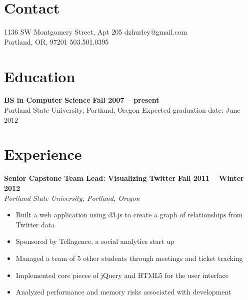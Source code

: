 \documentclass[margin,line]{resume}
\begin{document}
\begin{resume}

    \section{\mysidestyle Contact}

    1136 SW Montgomery Street, Apt 205  \hfill dzhurley@gmail.com  \vspace{0mm}\\\vspace{0mm}%
    Portland, OR, 97201                 \hfill 503.501.0395        \vspace{0mm}\\\vspace{0mm}%

    \section{\mysidestyle Education}

    \textbf{BS in Computer Science}             \hfill \textbf{ Fall 2007 -- present}      \vspace{2mm}\\\vspace{1mm}%
    Portland State University, Portland, Oregon \hfill Expected graduation date: June 2012 \vspace{-3mm}\\\vspace{-1mm}%

    \section{\mysidestyle Experience}

    \textbf{Senior Capstone Team Lead: Visualizing Twitter} \hfill \textbf{Fall 2011 -- Winter 2012} \vspace{2mm}\\\vspace{1mm}%
    \textsl{Portland State University, Portland, Oregon}
    \begin{itemize}
        \item Built a web application using d3.js to create a graph of relationships from Twitter data
        \item Sponsored by Tellagence, a social analytics start up
        \item Managed a team of 5 other students through meetings and ticket tracking
        \item Implemented core pieces of jQuery and HTML5 for the user interface
        \item Analyzed performance and memory risks associated with development
    \end{itemize}


\end{resume}
\end{document}
